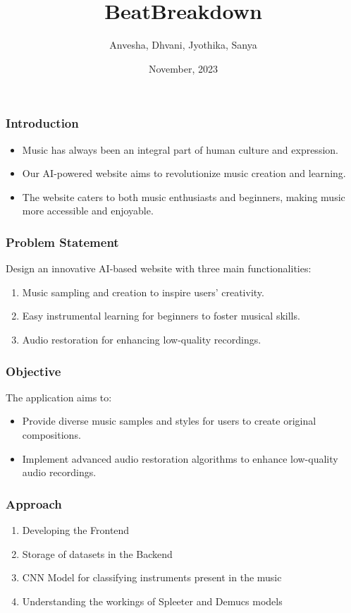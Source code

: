 \documentclass{beamer}
\title{ BeatBreakdown }
\author { Anvesha,  Dhvani,  Jyothika,  Sanya }
\date{November, 2023}
\begin{document}
\begin{frame}
  \titlepage
\end{frame}

\begin{frame}
  \frametitle{Introduction}
  \begin{itemize}
    \item Music has always been an integral part of human culture and 
expression.
    \item Our AI-powered website aims to revolutionize music 
creation and learning.
    \item The website caters to both music enthusiasts and beginners, 
making music more accessible and enjoyable.
  \end{itemize}
\end{frame}

\begin{frame}
  \frametitle{Problem Statement}
  Design an innovative AI-based website with three main 
functionalities:
  \begin{enumerate}
    \item Music sampling and creation to inspire users' creativity.
    \item Easy instrumental learning for beginners to foster musical skills.
    \item Audio restoration for enhancing low-quality recordings.
  \end{enumerate}
\end{frame}

\begin{frame}
  \frametitle{Objective}
  The application aims to:
  \begin{itemize}
    \item Provide diverse music samples and styles for users to create 
original compositions.
    \item Implement advanced audio restoration algorithms to enhance 
low-quality audio recordings.
  \end{itemize}
\end{frame}

\begin{frame}
  \frametitle{Approach}
  \begin{enumerate}
    \item Developing the Frontend
    \item Storage of datasets in the Backend 
    \item CNN Model for classifying instruments present in the music
    \item Understanding the workings of Spleeter and Demucs models
  \end{enumerate}
\end{frame}
\end{document}
